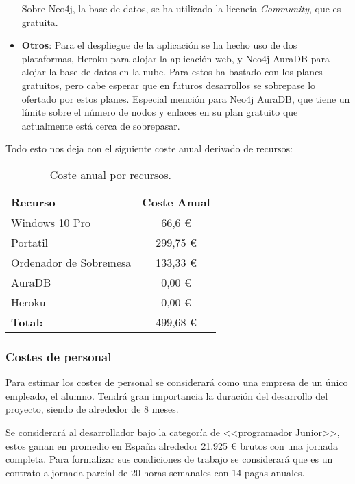 \begin{itemize}
Sobre Neo4j, la base de datos, se ha utilizado la licencia \textit{Community}, que es gratuita. 


\item \textbf{Otros}:
Para el despliegue de la aplicación se ha hecho uso de dos plataformas, Heroku para alojar la aplicación web, y Neo4j AuraDB para alojar la base de datos en la nube. Para estos ha bastado con los planes gratuitos, pero cabe esperar que en futuros desarrollos se sobrepase lo ofertado por estos planes. Especial mención para Neo4j AuraDB, que tiene un límite sobre el número de nodos y enlaces en su plan gratuito que actualmente está cerca de sobrepasar.


	
	
\end{itemize}

Todo esto nos deja con el siguiente coste anual derivado de recursos:

\begin{table}[h!]
	\centering
	\begin{tabular}{| l | c |}
		\toprule
		\textbf{Recurso} & \textbf{Coste Anual} \\ \midrule
		Windows 10 Pro & 66,6 €\\
		Portatil & 299,75 € \\
		Ordenador de Sobremesa & 133,33 €\\
		AuraDB & 0,00 €\\
		Heroku & 0,00 €\\
		\midrule
		\textbf{Total:} & 499,68 € \\
		\bottomrule
	\end{tabular}
	\caption{Coste anual por recursos.}
	\label{CostResources}
\end{table}

\subsubsection{Costes de personal}
Para estimar los costes de personal se considerará como una empresa de un único empleado, el alumno. Tendrá gran importancia la duración del desarrollo del proyecto, siendo de alrededor de 8 meses.

Se considerará al desarrollador bajo la categoría de <<programador Junior>>, estos ganan en promedio en España alrededor 21.925 € brutos con una jornada completa. Para formalizar sus condiciones de trabajo se considerará que es un contrato a jornada parcial de 20 horas semanales con 14 pagas anuales.

